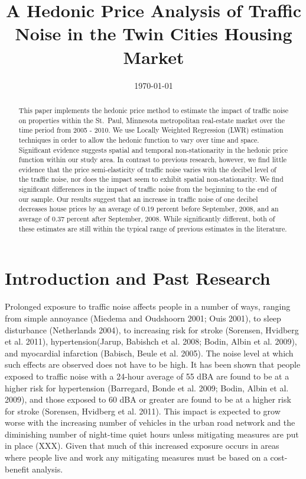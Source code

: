 \documentclass{article}\usepackage{graphicx, color}
\title{A Hedonic Price Analysis of Traffic Noise in the Twin Cities Housing Market}
\date{\today}
\begin{document}
\maketitle

\begin{abstract}
This paper implements the hedonic price method to estimate the impact of traffic noise on properties within the St.\ Paul, Minnesota metropolitan real-estate market over the time period from 2005 - 2010. We use Locally Weighted Regression (LWR) estimation techniques in order to allow the hedonic function to vary over time and space. Significant evidence suggests spatial and temporal non-stationarity in the hedonic price function within our study area. In contrast to previous research, however, we find little evidence that the price semi-elasticity of traffic noise varies with the decibel level of the traffic noise, nor does the impact seem to exhibit spatial non-stationarity. We find significant differences in the impact of traffic noise from the beginning to the end of our sample. Our results suggest that an increase in traffic noise of one decibel decreases house prices by an average of 0.19 percent before September, 2008, and an average of 0.37 percent after September, 2008. While significantly different, both of these estimates are still within the typical range of previous estimates in the literature.
\end{abstract}

\section{Introduction and Past Research}\label{sec:lit}
Prolonged exposure to traffic noise affects people in a number of ways, ranging from simple annoyance \citep{Weinhold2013, Miedema2001} (Miedema and Oudshoorn 2001; Ouis 2001), to sleep disturbance (Netherlands 2004), to increasing risk for stroke (Sorensen, Hvidberg et al. 2011), hypertension(Jarup, Babishch et al. 2008; Bodin, Albin et al. 2009), and myocardial infarction (Babisch, Beule et al. 2005). The noise level at which such effects are observed does not have to be high.  It has been shown that people exposed to traffic noise with a 24-hour average of 55 dBA are found to be at a higher risk for hypertension (Barregard, Bonde et al. 2009; Bodin, Albin et al. 2009), and those exposed to 60 dBA or greater are found to be at a higher risk for stroke (Sorensen, Hvidberg et al. 2011).  This impact is expected to grow worse with the increasing number of vehicles in the urban road network and the diminishing number of night-time quiet hours unless mitigating measures are put in place (XXX).  Given that much of this increased exposure occurs in areas where people live and work any mitigating measures must be based on a cost-benefit analysis.  
\end{document}
